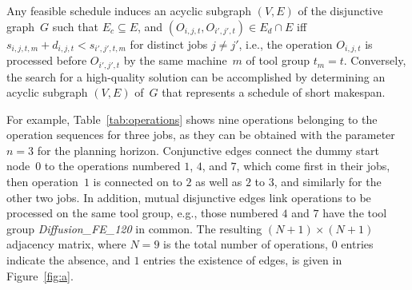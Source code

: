 \documentclass[runningheads]{llncs}
\begin{document}
Any feasible schedule induces an acyclic subgraph $(V,E)$ of 
the disjunctive graph~$G$
such that $E_c\subseteq E$, and $(O_{i,j,t},O_{i',j',t})\in E_d\cap E$
iff $s_{i,j,t,m}+d_{i,j,t} < s_{i',j',t,m}$ for distinct jobs $j\neq j'$,
i.e., the operation
$O_{i,j,t}$ is processed before $O_{i',j',t}$ by the same machine~$m$
of tool group $t_m=t$.
Conversely,
the search for a high-quality solution can be accomplished by
determining an acyclic subgraph $(V,E)$ of~$G$ that represents a schedule
of short makespan.

For example, Table~\ref{tab:operations} shows nine operations
belonging to the operation sequences for three jobs, as they can
be obtained with the parameter $n=3$ for the planning horizon.
Conjunctive edges connect the dummy start node~$0$ to
the operations numbered $1$, $4$, and $7$, which come first in their jobs,
then operation~$1$ is connected on to $2$ as well as $2$ to $3$,
and similarly for the other two jobs.
In addition, mutual disjunctive edges link operations
to be processed on the same tool group, e.g., those
numbered $4$ and $7$ have the tool group \textit{Diffusion\_FE\_120}
in common.
The resulting $(N+1)\times(N+1)$ adjacency matrix, where $N=9$ is the
total number of operations, $0$ entries indicate the absence, and
$1$ entries the existence of edges, is given in Figure~\ref{fig:a}.
\end{document}
